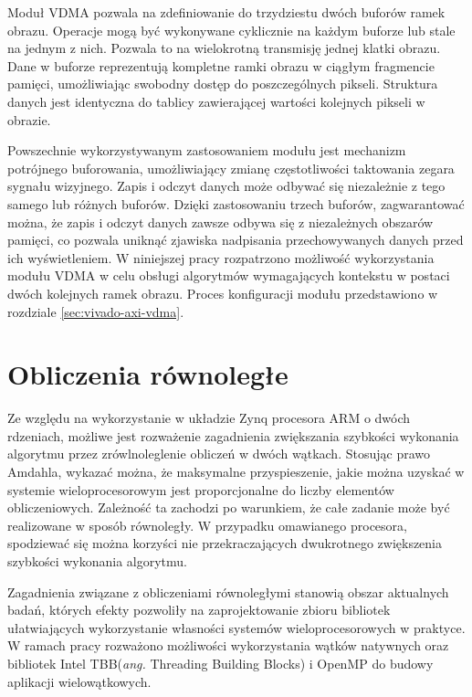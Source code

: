 Moduł VDMA pozwala na zdefiniowanie do trzydziestu dwóch buforów ramek obrazu. 
Operacje mogą być wykonywane cyklicznie na każdym buforze lub stale na jednym z nich. 
Pozwala to na wielokrotną transmisję jednej klatki obrazu.
Dane w buforze reprezentują kompletne ramki obrazu w ciągłym fragmencie pamięci, umożliwiając swobodny dostęp do poszczególnych pikseli. Struktura danych jest identyczna do tablicy zawierającej wartości kolejnych pikseli w obrazie.

Powszechnie wykorzystywanym zastosowaniem modułu jest mechanizm potrójnego buforowania, umożliwiający zmianę częstotliwości taktowania zegara sygnału wizyjnego. 
Zapis i odczyt danych może odbywać się niezależnie z tego samego lub różnych buforów. 
Dzięki zastosowaniu trzech buforów, zagwarantować można, że zapis i odczyt danych zawsze odbywa się z niezależnych obszarów pamięci, co pozwala uniknąć zjawiska nadpisania przechowywanych danych przed ich wyświetleniem.
W niniejszej pracy rozpatrzono możliwość wykorzystania modułu VDMA w celu obsługi algorytmów wymagających kontekstu w postaci dwóch kolejnych ramek obrazu.
Proces konfiguracji modułu przedstawiono w rozdziale \ref{sec:vivado-axi-vdma}.

\section{Obliczenia równoległe}
\label{sec:openmp}

Ze względu na wykorzystanie w układzie Zynq procesora ARM o dwóch rdzeniach, możliwe jest rozważenie zagadnienia zwiększania szybkości wykonania algorytmu przez zrówlnoleglenie obliczeń w dwóch wątkach. %
Stosując prawo Amdahla, wykazać można, że maksymalne przyspieszenie, jakie można uzyskać w systemie wieloprocesorowym jest proporcjonalne do liczby elementów obliczeniowych. 
Zależność ta zachodzi po warunkiem, że całe zadanie może być realizowane w sposób równoległy. 
W przypadku omawianego procesora, spodziewać się można korzyści nie przekraczających dwukrotnego zwiększenia szybkości wykonania algorytmu.

Zagadnienia związane z obliczeniami równoległymi stanowią obszar aktualnych badań, których efekty pozwoliły na zaprojektowanie zbioru bibliotek ułatwiających wykorzystanie własności systemów wieloprocesorowych w praktyce. 
W ramach pracy rozważono możliwości wykorzystania wątków natywnych oraz bibliotek Intel TBB(\emph{ang.} Threading Building Blocks) i OpenMP do budowy aplikacji wielowątkowych.

